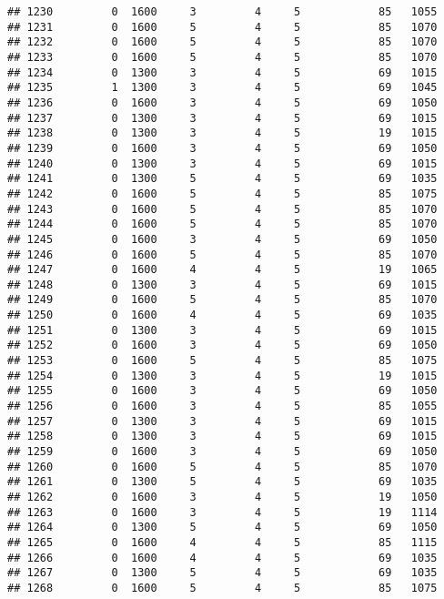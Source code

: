 \documentclass[]{article}
\begin{document}
\begin{verbatim}
## 1230         0  1600     3         4     5            85   1055
## 1231         0  1600     5         4     5            85   1070
## 1232         0  1600     5         4     5            85   1070
## 1233         0  1600     5         4     5            85   1070
## 1234         0  1300     3         4     5            69   1015
## 1235         1  1300     3         4     5            69   1045
## 1236         0  1600     3         4     5            69   1050
## 1237         0  1300     3         4     5            69   1015
## 1238         0  1300     3         4     5            19   1015
## 1239         0  1600     3         4     5            69   1050
## 1240         0  1300     3         4     5            69   1015
## 1241         0  1300     5         4     5            69   1035
## 1242         0  1600     5         4     5            85   1075
## 1243         0  1600     5         4     5            85   1070
## 1244         0  1600     5         4     5            85   1070
## 1245         0  1600     3         4     5            69   1050
## 1246         0  1600     5         4     5            85   1070
## 1247         0  1600     4         4     5            19   1065
## 1248         0  1300     3         4     5            69   1015
## 1249         0  1600     5         4     5            85   1070
## 1250         0  1600     4         4     5            69   1035
## 1251         0  1300     3         4     5            69   1015
## 1252         0  1600     3         4     5            69   1050
## 1253         0  1600     5         4     5            85   1075
## 1254         0  1300     3         4     5            19   1015
## 1255         0  1600     3         4     5            69   1050
## 1256         0  1600     3         4     5            85   1055
## 1257         0  1300     3         4     5            69   1015
## 1258         0  1300     3         4     5            69   1015
## 1259         0  1600     3         4     5            69   1050
## 1260         0  1600     5         4     5            85   1070
## 1261         0  1300     5         4     5            69   1035
## 1262         0  1600     3         4     5            19   1050
## 1263         0  1600     3         4     5            19   1114
## 1264         0  1300     5         4     5            69   1050
## 1265         0  1600     4         4     5            85   1115
## 1266         0  1600     4         4     5            69   1035
## 1267         0  1300     5         4     5            69   1035
## 1268         0  1600     5         4     5            85   1075

\end{verbatim}
\end{document}
